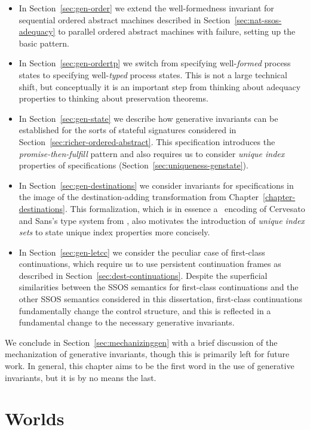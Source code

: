 \smallskip
\begin{itemize}
\item In Section~\ref{sec:gen-order} we extend the well-formedness
  invariant for sequential ordered abstract machines described in 
  Section~\ref{sec:nat-ssos-adequacy} to parallel ordered abstract
  machines with failure, setting up the basic pattern.
\item In Section~\ref{sec:gen-ordertp} we switch from specifying
  well-{\it formed} process states to specifying well-{\it typed}
  process states.  This is not a large technical shift, but
  conceptually it is an important step from thinking about adequacy
  properties to thinking about preservation theorems.
\item In Section~\ref{sec:gen-state} we describe how generative
  invariants can be established for the sorts of stateful signatures
  considered in Section~\ref{sec:richer-ordered-abstract}. This
  specification introduces the {\it promise-then-fulfill} pattern and
  also requires us to consider {\it unique index} properties of
  specifications (Section~\ref{sec:uniqueness-genstate}).
\item In Section~\ref{sec:gen-destinations} we consider invariants for
  specifications in the image of the destination-adding transformation
  from Chapter~\ref{chapter-destinations}. This formalization, which
  is in essence a \sls~encoding of Cervesato and Sans's type system
  from \cite{cervesato13substructural}, also motivates the introduction of
  {\it unique index sets} to state unique index properties more concisely.
\item In Section~\ref{sec:gen-letcc} we consider the peculiar case of
  first-class continuations, which require us to use persistent
  continuation frames as described in
  Section~\ref{sec:dest-continuations}. Despite the superficial
  similarities between the SSOS semantics for first-class
  continuations and the other SSOS semantics considered in this
  dissertation, first-class continuations fundamentally change the control
  structure, and this is reflected in a fundamental change to the
  necessary generative invariants.
\end{itemize}
\smallskip We conclude in Section~\ref{sec:mechanizinggen} with a
brief discussion of the mechanization of generative invariants, though
this is primarily left for future work. In general, this chapter aims
to be the first word in the use of generative invariants, but it is by no
means the last.

\section{Worlds}
\label{sec:gen-worlds}

